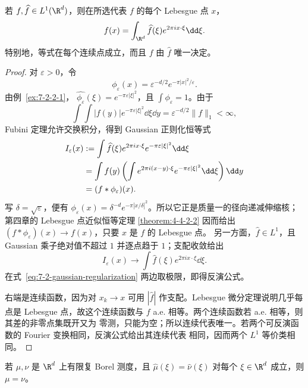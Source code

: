 \begin{theorem}[Fourier 反演]\label{theorem:7-2-2-3}
若 $f,\widehat f\in L^1(\R^d)$，则在所选代表 $f$ 的每个 Lebesgue 点 $x$，
\begin{equation}\label{eq:7-2-fourier-inversion}
 f(x)=\int_{\R^d}\widehat f(\xi)e^{2\pi ix\cdot\xi}\dd\xi.
\end{equation}
特别地，等式在每个连续点成立，而且 $f$ 由 $\widehat f$ 唯一决定。
\end{theorem}

\begin{proof}
对 $\varepsilon>0$，令
\[
 \phi_\varepsilon(x)=\varepsilon^{-d/2}e^{-\pi|x|^2/\varepsilon}.
\]
由例~\ref{ex:7-2-2-1}，
$\widehat{\phi_\varepsilon}(\xi)=e^{-\pi\varepsilon|\xi|^2}$，且
$\int\phi_\varepsilon=1$。由于
\[
 \int\!\!\int |f(y)|e^{-\pi\varepsilon|\xi|^2}\dd\xi\dd y
 =\varepsilon^{-d/2}\|f\|_1<\infty,
\]
Fubini 定理允许交换积分，得到 Gaussian 正则化恒等式
\begin{align}
 I_\varepsilon(x)
 &:=\int\widehat f(\xi)e^{2\pi ix\cdot\xi}
                 e^{-\pi\varepsilon|\xi|^2}\dd\xi\notag\\
 &=\int f(y)\left(\int e^{2\pi i(x-y)\cdot\xi}
                 e^{-\pi\varepsilon|\xi|^2}\dd\xi\right)\dd y\notag\\
 &=(f*\phi_\varepsilon)(x).
 \label{eq:7-2-gaussian-regularization}
\end{align}
写 $\delta=\sqrt\varepsilon$，便有
$\phi_\varepsilon(x)=\delta^{-d}e^{-\pi|x/\delta|^2}$。所以它正是质量一的径向递减伸缩核；
第四章的 Lebesgue 点近似恒等定理
\ref{theorem:4-4-2-2} 因而给出
$(f*\phi_\varepsilon)(x)\to f(x)$，只要 $x$ 是 $f$ 的 Lebesgue 点。
另一方面，$\widehat f\in L^1$，且 Gaussian 乘子绝对值不超过 $1$ 并逐点趋于 $1$；支配收敛给出
\[
 I_\varepsilon(x)\longrightarrow
 \int\widehat f(\xi)e^{2\pi ix\cdot\xi}\dd\xi.
\]
在式~\eqref{eq:7-2-gaussian-regularization} 两边取极限，即得反演公式。

右端是连续函数，因为对 $x_k\to x$ 可用 $|\widehat f|$ 作支配。Lebesgue 微分定理说明几乎每点是
Lebesgue 点，故这个连续函数与 $f$ a.e. 相等。两个连续函数若 a.e. 相等，则其差的非零点集既开又为
零测，只能为空；所以连续代表唯一。若两个可反演函数的 Fourier 变换相同，反演公式给出其连续代表
相同，因而两个 $L^1$ 等价类相同。
\end{proof}

\begin{proposition}[测度唯一性]\label{proposition:7-2-2-4}
若 $\mu,\nu$ 是 $\R^d$ 上有限复 Borel 测度，且
$\widehat\mu(\xi)=\widehat\nu(\xi)$ 对每个 $\xi\in\R^d$ 成立，则 $\mu=\nu$。
\end{proposition}


